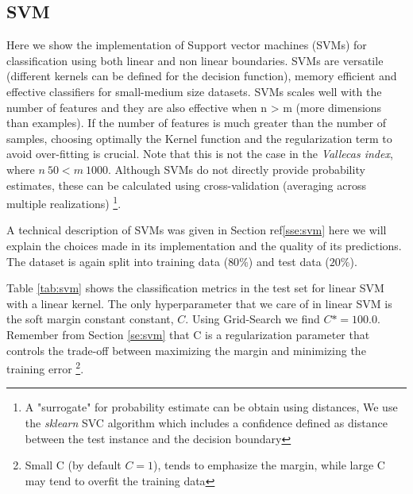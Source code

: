 \documentclass[11pt]{article}
\theoremstyle{definition}
\theoremstyle{remark}
\begin{document}
\subsection{SVM}
\label{se:ressvm}
Here we show the implementation of Support vector machines (SVMs) for classification using both linear and non linear boundaries. SVMs are versatile (different kernels can be defined for the decision function), memory efficient and effective classifiers for small-medium size datasets. SVMs scales well with the number of features and they are also effective when n > m (more dimensions than examples). If the number of features is much greater than the number of samples, choosing optimally the Kernel function and the regularization term to avoid over-fitting is crucial. Note that this is not the case in the \emph{Vallecas index}, where $n~50 < m~1000$. Although SVMs do not directly provide probability estimates, these can be calculated using cross-validation (averaging across multiple realizations) \footnote{A "surrogate" for probability estimate can be obtain using distances, We use the \emph{sklearn} SVC algorithm which includes a confidence defined as distance between the test instance and the decision boundary}.

A technical description of SVMs was given in Section ref\ref{sse:svm} here we will explain the choices made in its implementation and the quality of its predictions. 
The dataset is again split into training data ($80\%$) and test data ($20\%$). 

Table \ref{tab:svm} shows the classification metrics in the test set for linear SVM with a linear kernel. The only hyperparameter that we care of in linear SVM is the soft margin constant constant, $C$. Using Grid-Search we find $C* =100.0$. Remember from Section \ref{se:svm} that C is a regularization parameter that controls the trade-off between maximizing the margin and minimizing the training error \footnote{Small C (by default $C=1$), tends to emphasize the margin, while large C may tend to overfit the training data}.
\end{document}

